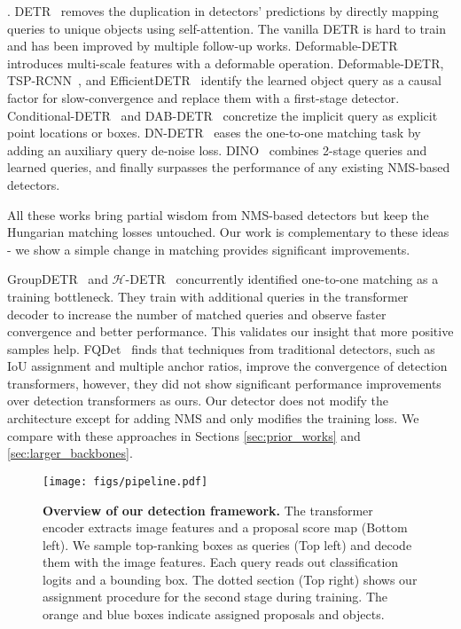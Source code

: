 \documentclass[10pt,twocolumn,letterpaper]{article}
\newcommand{\myparagraph}[1]{\vspace{2pt}\noindent{\textbf{#1}}}
\newcommand{\nmsdets}{{NMS-based detectors\xspace}}
\newcommand{\lblfig}[1]{\label{fig:#1}}
\begin{document}
\myparagraph{End-to-end detectors}.
DETR~\cite{carion2020end} removes the duplication in detectors' predictions by directly mapping queries to unique objects using self-attention.
The vanilla DETR is hard to train and has been improved by multiple follow-up works.
Deformable-DETR~\cite{zhu2020deformable} introduces multi-scale features with a deformable operation.
Deformable-DETR, TSP-RCNN~\cite{sun2020rethinking}, and EfficientDETR~\cite{yao2021efficient} identify the learned object query as a causal factor for slow-convergence and replace them with a first-stage detector.
Conditional-DETR~\cite{meng2021conditional} and DAB-DETR~\cite{liu2022dab} concretize the implicit query as explicit point locations or boxes.
DN-DETR~\cite{li2022dn} eases the one-to-one matching task by adding an auxiliary query de-noise loss.
DINO~\cite{zhang2022dino} combines 2-stage queries and learned queries, and finally surpasses the performance of any existing \nmsdets.

All these works bring partial wisdom from \nmsdets{} but keep the Hungarian matching losses untouched.
Our work is complementary to these ideas - we show a simple change in matching provides significant improvements.

GroupDETR~\cite{chen2022group} and $\mathcal{H}$-DETR~\cite{jia2022detrs} concurrently identified one-to-one matching as a training bottleneck.
They train with additional queries in the transformer decoder to increase the number of matched queries and observe faster convergence and better performance.
This validates our insight that more positive samples help.
FQDet~\cite{picron2022fqdet} finds that techniques from traditional detectors, such as IoU assignment and multiple anchor ratios, improve the convergence of detection transformers, however, they did not show significant performance improvements over detection transformers as ours.
Our detector does not modify the architecture except for adding NMS and only modifies the training loss. 
We compare with these approaches in Sections \ref{sec:prior_works} and \ref{sec:larger_backbones}.


\begin{figure*}
    \centering
    \texttt{[image: figs/pipeline.pdf]}
    \caption{
    \textbf{Overview of our detection framework.}
    The transformer encoder extracts image features and a proposal score map (Bottom left).
    We sample top-ranking boxes as queries (Top left) and decode them with the image features.
    Each query reads out classification logits and a bounding box.
    The dotted section (Top right) shows our assignment procedure for the second stage during training.
    The \textcolor{mytangoorange}{orange} and \textcolor{mytangoblue}{blue} boxes indicate assigned proposals and objects.
    }
    \lblfig{pipeline}
\end{figure*}
\end{document}
